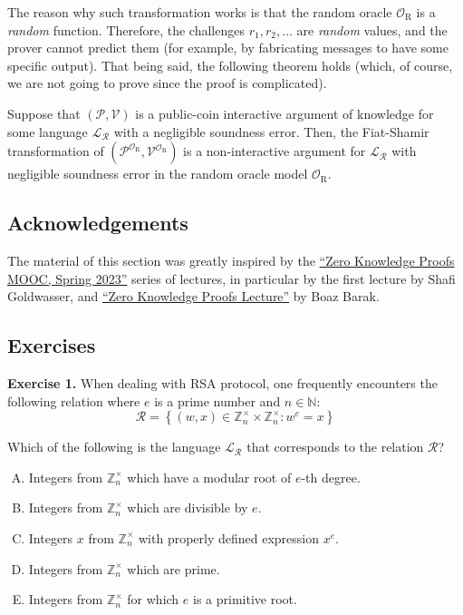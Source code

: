 \documentclass[../lecture-notes-148x210.tex]{subfiles}
\begin{document}
The reason why such transformation works is that the random oracle
$\mathcal{O}_{\text{R}}$ is a \textit{random} function. Therefore, the
challenges $r_1,r_2,\dots$ are \textit{random} values, and the prover cannot
predict them (for example, by fabricating messages to have some specific
output). That being said, the following theorem holds (which, of course, we are
not going to prove since the proof is complicated).

\begin{theorem}
    Suppose that $(\mathcal{P},\mathcal{V})$ is a public-coin interactive
    argument of knowledge for some language $\mathcal{L}_{\mathcal{R}}$ with a
    negligible soundness error. Then, the Fiat-Shamir transformation of
    $(\mathcal{P}^{\mathcal{O}_{\text{R}}},\mathcal{V}^{\mathcal{O}_{\text{R}}})$
    is a non-interactive argument for $\mathcal{L}_{\mathcal{R}}$ with
    negligible soundness error in the random oracle model
    $\mathcal{O}_{\text{R}}$.
\end{theorem}

\subsection*{Acknowledgements}

The material of this section was greatly inspired by the
\href{https://rdi.berkeley.edu/zk-learning/}{``Zero Knowledge Proofs MOOC,
Spring 2023''} series of lectures, in particular by the first lecture by Shafi
Goldwasser, and
\href{https://www.cs.princeton.edu/courses/archive/fall07/cos433/lec15.pdf}{``Zero
Knowledge Proofs Lecture''} by Boaz Barak.

\subsection{Exercises}

\textbf{Exercise 1.} When dealing with RSA protocol, one frequently encounters the following relation where $e$ is a prime number and $n \in \mathbb{N}$:
\begin{equation*}
    \mathcal{R} = \left\{ (w, x) \in \mathbb{Z}_n^{\times} \times \mathbb{Z}_n^{\times}: w^e = x \right\}
\end{equation*}

Which of the following is the language $\mathcal{L}_{\mathcal{R}}$ that corresponds to the relation $\mathcal{R}$?
\begin{enumerate}[(A)]
    \item Integers from $\mathbb{Z}_n^{\times}$ which have a modular root of $e$-th degree.
    \item Integers from $\mathbb{Z}_n^{\times}$ which are divisible by $e$.
    \item Integers $x$ from $\mathbb{Z}_n^{\times}$ with properly defined expression $x^e$.
    \item Integers from $\mathbb{Z}_n^{\times}$ which are prime.
    \item Integers from $\mathbb{Z}_n^{\times}$ for which $e$ is a primitive root.
\end{enumerate}
\end{document}

